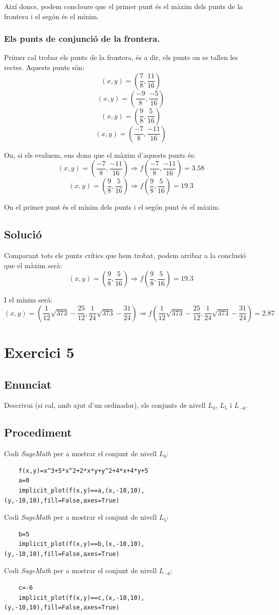 \documentclass[12pt]{report}
\begin{document}
Així doncs, podem concloure que el primer punt és el màxim dels punts de la frontera i el segón és el mínim.

\subsection{Els punts de conjunció de la frontera.}
Primer cal trobar els punts de la frontera, és a dir, els punts on es tallen les rectes.
Aquests punts són:
\[(x,y) = \left(\frac{7}{8}, \frac{11}{16}\right) \]
\[(x,y) = \left(\frac{-9}{8}, \frac{-5}{16}\right) \]
\[(x,y) = \left(\frac{9}{8}, \frac{5}{16}\right) \]
\[(x,y) = \left(\frac{-7}{8}, \frac{-11}{16}\right) \]

On, si els evaluem, ens dona que el màxim d'aquests punts és:
\[(x,y) = \left(\frac{-7}{8}, \frac{-11}{16}\right) \Rightarrow f\left(\frac{-7}{8}, \frac{-11}{16}\right) = 3.58 \]
\[(x,y) = \left(\frac{9}{8}, \frac{5}{16}\right) \Rightarrow f\left(\frac{9}{8}, \frac{5}{16}\right) = 19.3 \]

On el primer punt és el mínim dels punts i el segón punt és el màxim.
\newpage

\section{Solució}
Comparant tots els punts crítics que hem trobat, podem arribar a la conclusió que el màxim serà:
\[(x,y) = \left(\frac{9}{8}, \frac{5}{16}\right) \Rightarrow f\left(\frac{9}{8}, \frac{5}{16}\right) = 19.3 \]

I el mínim serà:
\[(x,y) = \left(\frac{1}{12}\sqrt{373} - \frac{25}{12}, \frac{1}{24}\sqrt{373} - \frac{31}{24} \right) \Rightarrow f\left(\frac{1}{12}\sqrt{373} - \frac{25}{12}, \frac{1}{24}\sqrt{373} - \frac{31}{24} \right) = 2.87\]


\chapter{Exercici 5}
\section{Enunciat}
Descrivui (si cal, amb ajut d'un ordinador), els conjunts de nivell \textit{$L_0$}, \textit{$L_5$} i \textit{$L_{-6}$}.
\section{Procediment}
Codi \textit{SageMath} per a mostrar el conjunt de nivell $L_0$:
\begin{verbatim}
    f(x,y)=x^3+5*x^2+2*x*y+y^2+4*x+4*y+5
    a=0
    implicit_plot(f(x,y)==a,(x,-10,10),(y,-10,10),fill=False,axes=True)
\end{verbatim}
Codi \textit{SageMath} per a mostrar el conjunt de nivell $L_5$:
\begin{verbatim}
    b=5
    implicit_plot(f(x,y)==b,(x,-10,10),(y,-10,10),fill=False,axes=True)
\end{verbatim}
Codi \textit{SageMath} per a mostrar el conjunt de nivell $L_{-6}$:
\begin{verbatim}
    c=-6
    implicit_plot(f(x,y)==c,(x,-10,10),(y,-10,10),fill=False,axes=True)
\end{verbatim}
\end{document}

